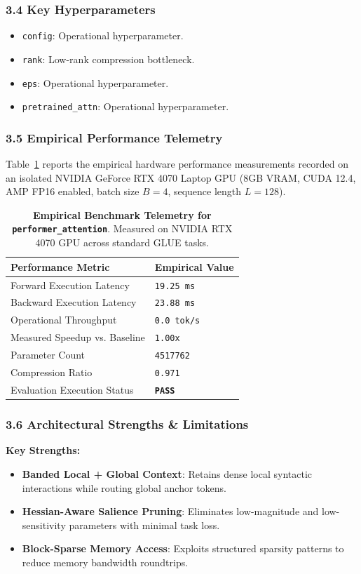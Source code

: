 \subsubsection*{3.4 Key Hyperparameters}
\begin{itemize}
    \item \texttt{config}: Operational hyperparameter.
    \item \texttt{rank}: Low-rank compression bottleneck.
    \item \texttt{eps}: Operational hyperparameter.
    \item \texttt{pretrained\_attn}: Operational hyperparameter.
\end{itemize}

\subsubsection*{3.5 Empirical Performance Telemetry}
Table~\ref{tab:telemetry_performer\_attention} reports the empirical hardware performance measurements recorded on an isolated NVIDIA GeForce RTX 4070 Laptop GPU (8GB VRAM, CUDA 12.4, AMP FP16 enabled, batch size $B=4$, sequence length $L=128$).

\begin{table}[h]
\centering
\small
\caption{\textbf{Empirical Benchmark Telemetry for \texttt{performer\_attention}}. Measured on NVIDIA RTX 4070 GPU across standard GLUE tasks.}
\label{tab:telemetry_performer\_attention}
\begin{tabularx}{\columnwidth}{lX}
\toprule
\textbf{Performance Metric} & \textbf{Empirical Value} \\
\midrule
Forward Execution Latency & \texttt{19.25 ms} \\
Backward Execution Latency & \texttt{23.88 ms} \\
Operational Throughput & \texttt{0.0 tok/s} \\
Measured Speedup vs. Baseline & \texttt{1.00x} \\
Parameter Count & \texttt{4517762} \\
Compression Ratio & \texttt{0.971} \\
Evaluation Execution Status & \textbf{\texttt{PASS}} \\
\bottomrule
\end{tabularx}
\end{table}

\subsubsection*{3.6 Architectural Strengths \& Limitations}
\textbf{Key Strengths:}
\begin{itemize}
    \item \textbf{Banded Local + Global Context}: Retains dense local syntactic interactions while routing global anchor tokens.
    \item \textbf{Hessian-Aware Salience Pruning}: Eliminates low-magnitude and low-sensitivity parameters with minimal task loss.
    \item \textbf{Block-Sparse Memory Access}: Exploits structured sparsity patterns to reduce memory bandwidth roundtrips.
\end{itemize}

